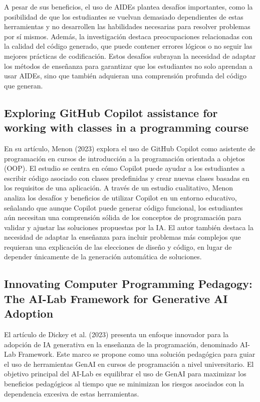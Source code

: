 \documentclass[a4paper,10pt]{article}
\begin{document}
A pesar de sus beneficios, el uso de AIDEs plantea desafíos importantes, como la posibilidad de que los estudiantes se vuelvan demasiado dependientes de estas herramientas y no desarrollen las habilidades necesarias para resolver problemas por sí mismos. Además, la investigación destaca preocupaciones relacionadas con la calidad del código generado, que puede contener errores lógicos o no seguir las mejores prácticas de codificación. Estos desafíos subrayan la necesidad de adaptar los métodos de enseñanza para garantizar que los estudiantes no solo aprendan a usar AIDEs, sino que también adquieran una comprensión profunda del código que generan.

\subsection*{Exploring GitHub Copilot assistance for working with classes in a programming course}

En su artículo, Menon (2023) \cite{menon2023exploring} explora el uso de GitHub Copilot como asistente de programación en cursos de introducción a la programación orientada a objetos (OOP). El estudio se centra en cómo Copilot puede ayudar a los estudiantes a escribir código asociado con clases predefinidas y crear nuevas clases basadas en los requisitos de una aplicación. A través de un estudio cualitativo, Menon analiza los desafíos y beneficios de utilizar Copilot en un entorno educativo, señalando que aunque Copilot puede generar código funcional, los estudiantes aún necesitan una comprensión sólida de los conceptos de programación para validar y ajustar las soluciones propuestas por la IA. El autor también destaca la necesidad de adaptar la enseñanza para incluir problemas más complejos que requieran una explicación de las elecciones de diseño y código, en lugar de depender únicamente de la generación automática de soluciones.

\subsection*{Innovating Computer Programming Pedagogy: The AI-Lab Framework for Generative AI Adoption}

El artículo de Dickey et al. (2023) \cite{dickey2023innovatingcomputerprogrammingpedagogy} presenta un enfoque innovador para la adopción de IA generativa en la enseñanza de la programación, denominado AI-Lab Framework. Este marco se propone como una solución pedagógica para guiar el uso de herramientas GenAI en cursos de programación a nivel universitario. El objetivo principal del AI-Lab es equilibrar el uso de GenAI para maximizar los beneficios pedagógicos al tiempo que se minimizan los riesgos asociados con la dependencia excesiva de estas herramientas.
\end{document}
